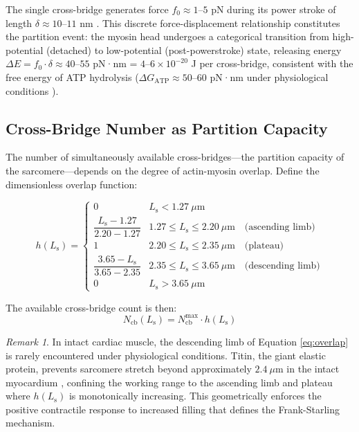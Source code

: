 \documentclass[12pt,a4paper]{article}
\theoremstyle{remark}
\newtheorem{remark}[theorem]{Remark}
\newcommand{\Ncb}{N_{\mathrm{cb}}}
\newcommand{\Ls}{L_{\mathrm{s}}}
\begin{document}
The single cross-bridge generates force $f_0 \approx 1$--$5$ pN during its power stroke of length $\delta \approx 10$--$11$ nm \cite{finer1994single}. This discrete force-displacement relationship constitutes the partition event: the myosin head undergoes a categorical transition from high-potential (detached) to low-potential (post-powerstroke) state, releasing energy $\Delta E = f_0 \cdot \delta \approx 40$--$55$ pN·nm = $4$--$6 \times 10^{-20}$ J per cross-bridge, consistent with the free energy of ATP hydrolysis ($\Delta G_{\mathrm{ATP}} \approx 50$--$60$ pN·nm under physiological conditions \cite{kushmerick1992chemical}).

\subsection{Cross-Bridge Number as Partition Capacity}

The number of simultaneously available cross-bridges—the partition capacity of the sarcomere—depends on the degree of actin-myosin overlap. Define the dimensionless overlap function:

\begin{equation}
    h(\Ls) = \begin{cases}
        0 & \Ls < 1.27~\mu\mathrm{m} \\[4pt]
        \dfrac{\Ls - 1.27}{2.20 - 1.27} & 1.27 \leq \Ls \leq 2.20~\mu\mathrm{m} \quad \text{(ascending limb)} \\[8pt]
        1 & 2.20 \leq \Ls \leq 2.35~\mu\mathrm{m} \quad \text{(plateau)} \\[4pt]
        \dfrac{3.65 - \Ls}{3.65 - 2.35} & 2.35 \leq \Ls \leq 3.65~\mu\mathrm{m} \quad \text{(descending limb)} \\[4pt]
        0 & \Ls > 3.65~\mu\mathrm{m}
    \end{cases}
    \label{eq:overlap}
\end{equation}

The available cross-bridge count is then:
\begin{equation}
    \Ncb(\Ls) = \Ncb^{\max} \cdot h(\Ls)
    \label{eq:Ncb}
\end{equation}

\begin{remark}
    In intact cardiac muscle, the descending limb of Equation \ref{eq:overlap} is rarely encountered under physiological conditions. Titin, the giant elastic protein, prevents sarcomere stretch beyond approximately $2.4~\mu\mathrm{m}$ in the intact myocardium \cite{granzier2002giant}, confining the working range to the ascending limb and plateau where $h(\Ls)$ is monotonically increasing. This geometrically enforces the positive contractile response to increased filling that defines the Frank-Starling mechanism.
\end{remark}
\end{document}
